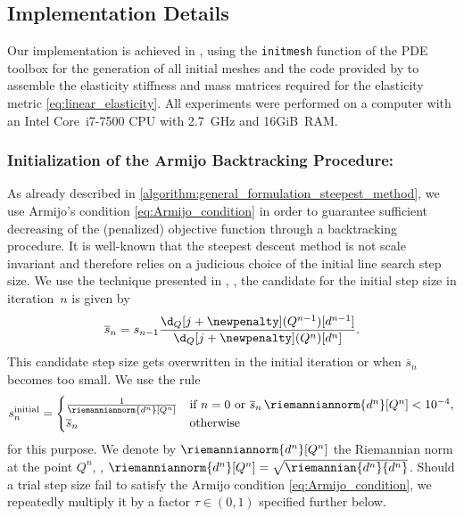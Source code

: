 \subsection{Implementation Details}
\label{subsection:implementation_details}

Our implementation is achieved in \matlab, using the \lstinline!initmesh! function of the PDE toolbox for the generation of all initial meshes and the code provided by \cite{Koko:2016:1,Koko:2016:2} to assemble the elasticity stiffness and mass matrices required for the elasticity metric \eqref{eq:linear_elasticity}.
All experiments were performed on a computer with an Intel Core~i7-7500 CPU with 2.7~GHz and 16GiB~RAM.


\subsubsection*{Initialization of the Armijo Backtracking Procedure:}
As already described in \cref{algorithm:general_formulation_steepest_method}, we use Armijo's condition \eqref{eq:Armijo_condition} in order to guarantee sufficient decreasing of the (penalized) objective function through a backtracking procedure.
It is well-known that the steepest descent method is not scale invariant and therefore relies on a judicious choice of the initial line search step size.
We use the technique presented in \cite[p.59]{NocedalWright:2006:1}, \ie, the candidate for the initial step size in iteration~$n$ is given by
\begin{equation*}
	\overline{s}_n
	=
	s_{n-1} \frac{\d_Q [j+\newpenalty](Q^{n-1})[d^{n-1}]}{\d_Q [j+\newpenalty](Q^n)[d^n]}
	.
\end{equation*}
This candidate step size gets overwritten in the initial iteration or when $\overline{s}_n$ becomes too small.
We use the rule
\begin{equation}
	\label{eq:definition_sbar}
	s^\text{initial}_n
	=
	\begin{cases}
		\frac{1}{\riemanniannorm{d^n}[Q^n]}
		&
		\text{if $n=0$ or $\overline{s}_n \, \riemanniannorm{d^n}[Q^n] < 10^{-4}$}
		,
		\\
		\overline{s}_n
		&
		\text{otherwise}
	\end{cases}
\end{equation}
for this purpose.
We denote by $ \riemanniannorm{d^n}[Q^n]$ the Riemannian norm at the point $Q^n$,  \ie, $\riemanniannorm{d^n}[Q^n] = \sqrt{\riemannian{d^n}{d^n}}$.
Should a trial step size fail to satisfy the Armijo condition \eqref{eq:Armijo_condition}, we repeatedly multiply it by a factor $\tau \in (0,1)$ specified further below.

